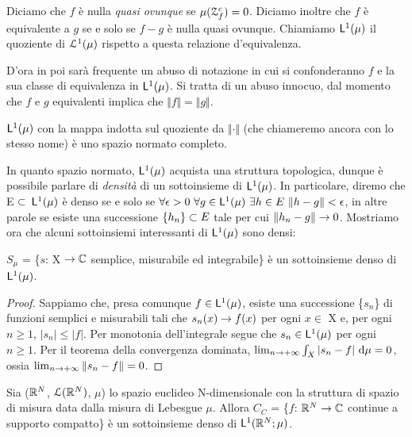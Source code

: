 \documentclass[Completo.tex]{subfiles}
\begin{document}
	\begin{Def}
		Diciamo che $f$ è nulla \textit{quasi ovunque} se $\mu(\eu[Z]_f^{c}) = 0$. Diciamo inoltre che $f$ è equivalente a $g$ se e solo se $f-g$ è nulla quasi ovunque. Chiamiamo $\sf[L]^1(\mu)$ il quoziente di $\eu[L]^1(\mu)$ rispetto a questa relazione d'equivalenza.
	\end{Def}
	\begin{Oss}
		D'ora in poi sarà frequente un abuso di notazione in cui si confonderanno $f$ e la sua classe di equivalenza in $\sf[L]^1(\mu)$. Si tratta di un abuso innocuo, dal momento che $f$ e $g$ equivalenti implica che $\Vert f \Vert = \Vert g \Vert$.
	\end{Oss}
	\begin{eTh}
		$\sf[L]^1(\mu)$ con la mappa indotta sul quoziente da $\Vert \cdot \Vert$ (che chiameremo ancora con lo stesso nome) è uno spazio normato completo.
	\end{eTh}
	In quanto spazio normato, $\sf[L]^1(\mu)$ acquista una struttura topologica, dunque è possibile parlare di \textit{densità} di un sottoinsieme di $\sf[L]^1(\mu)$. In particolare, diremo che E $\subset$ $\sf[L]^1(\mu)$ è denso se e solo se $\forall \epsilon > 0 \ \forall g \in \sf[L]^1(\mu) \ \exists h \in E \ \Vert h - g \Vert < \epsilon$, in altre parole se esiste una successione $\{h_n\} \subset E$ tale per cui $\Vert h_n-g \Vert \rightarrow 0$. Mostriamo ora che alcuni sottoinsiemi interessanti di $\sf[L]^1(\mu)$ sono densi:
	\begin{eTh}
		$S_\mu$ = \{$s$: X $\ra \bb[C]$ semplice, misurabile ed integrabile\} è un sottoinsieme denso di $\sf[L]^1(\mu)$.
	\end{eTh}
	\begin{proof}
		Sappiamo che, presa comunque $f \in \sf[L]^1(\mu)$, esiste una successione \{$s_n$\} di funzioni semplici e misurabili tali che $s_n(x) \rightarrow f(x)$ per ogni $x \in$ X e, per ogni $n \geq 1$, $\vert s_n \vert \leq \vert f \vert$. Per monotonia dell'integrale segue che $s_n \in \sf[L]^1(\mu)$ per ogni $n \geq 1$. Per il teorema della convergenza dominata, $\lim_{n \ra +\infty} \int_X \vert s_n - f \vert \ \mathrm{d}\mu = 0$, ossia $\lim_{n \rightarrow +\infty} \Vert s_n - f \Vert = 0$.
	\end{proof}
	\begin{Th}
		Sia ($\bb[R]^{N}$, $\eu[L](\bb[R]^{N})$, $\mu$) lo spazio euclideo N-dimensionale con la struttura di spazio di misura data dalla misura di Lebesgue $\mu$. Allora $C_C$ = \{$f$: $\bb[R]^{N} \ra \bb[C]$ continue a supporto compatto\} è un sottoinsieme denso di $\sf[L]^1(\bb[R]^{N}; \mu)$.
	\end{Th}
	
\end{document}
